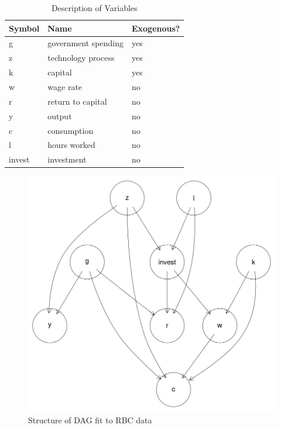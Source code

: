\documentclass{article}
\begin{document}
\begin{table}
\centering
\begin{tabular}{|l|l|l|}
  \hline
  Symbol & Name & Exogenous? \\
  \hline
  g & government spending & yes \\
  z & technology process & yes \\
  k & capital & yes \\
  w & wage rate & no \\
  r & return to capital & no \\
  y & output & no \\
  c & consumption & no \\
  l & hours worked & no \\
  invest & investment & no \\ \cline{2-2}
  \hline
\end{tabular}
\caption{Description of Variables}
\label{tab1}
\end{table}

\begin{figure}
\centering
\label{rbcdag}
\includegraphics[width=\textwidth, height=0.4\textheight, keepaspectratio]{rbc_baseline_model.png}
\caption{Structure of DAG fit to RBC data}
\end{figure}
\end{document}
